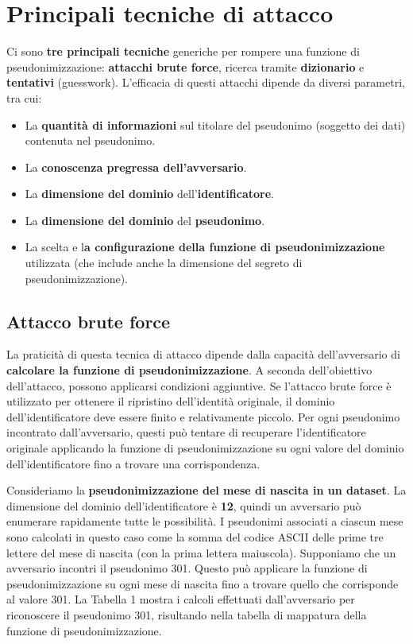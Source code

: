 \chapter{Principali tecniche di attacco}

Ci sono\textbf{ tre principali tecniche} generiche per rompere una funzione di pseudonimizzazione: \textbf{attacchi brute force}, ricerca tramite \textbf{dizionario} e\textbf{ tentativi} (guesswork). L'efficacia di questi attacchi dipende da diversi parametri, tra cui:
\begin{itemize}
  \item La\textbf{ quantità di informazioni} sul titolare del pseudonimo (soggetto dei dati) contenuta nel pseudonimo.
  \item La \textbf{conoscenza pregressa dell'avversario}.
  \item La\textbf{ dimensione del dominio} dell'\textbf{identificatore}.
  \item La \textbf{dimensione del dominio} del \textbf{pseudonimo}.
  \item La scelta e l\textbf{a configurazione della funzione di pseudonimizzazione} utilizzata (che include anche la 
  dimensione del segreto di pseudonimizzazione).
\end{itemize}

\section{Attacco brute force}

La praticità di questa tecnica di attacco dipende dalla capacità dell'avversario di \textbf{calcolare la funzione di pseudonimizzazione}. 
A seconda dell'obiettivo dell'attacco, possono applicarsi condizioni aggiuntive. Se l'attacco brute force è utilizzato per ottenere il ripristino dell'identità originale, il dominio dell'identificatore deve essere finito e relativamente piccolo. Per ogni pseudonimo incontrato dall'avversario, questi può tentare di recuperare l'identificatore originale applicando la funzione di pseudonimizzazione su ogni valore del dominio dell'identificatore fino a trovare una corrispondenza.

Consideriamo la\textbf{ pseudonimizzazione del mese di nascita in un dataset}. La dimensione del dominio dell'identificatore è \textbf{12}, quindi un avversario può enumerare rapidamente tutte le possibilità. I pseudonimi associati a ciascun mese sono calcolati in questo caso come la somma del codice ASCII delle prime tre lettere del mese di nascita (con la prima lettera maiuscola). Supponiamo che un avversario incontri il pseudonimo 301. Questo può applicare la funzione di pseudonimizzazione su ogni mese di nascita fino a trovare quello che corrisponde al valore 301. La Tabella 1 mostra i calcoli effettuati dall'avversario per riconoscere il pseudonimo 301, risultando nella tabella di mappatura della funzione di pseudonimizzazione.

